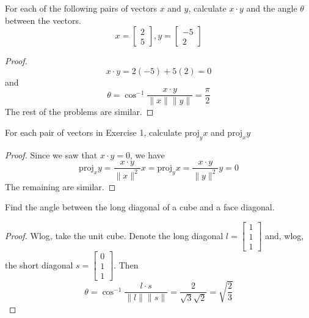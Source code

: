 \begin{exercise} \label{e1.2.1}
    For each of the following pairs of vectors \( x \) and \( y \), calculate \( x \cdot y \) and the angle \( \theta \) between the vectors.
    \[
    x=\begin{bmatrix}2\\5\end{bmatrix},y=\begin{bmatrix}-5\\2\end{bmatrix}
    \]
    \begin{proof}
        \[ x \cdot y = 2(-5)+5(2) = 0 \]
        and
        \[
        \theta = \cos^{-1}{\frac{x\cdot y}{\lVert x \rVert \lVert y \rVert}} = \frac{\pi}{2}
        \]
        The rest of the problems are similar.
    \end{proof}
\end{exercise} %

\begin{exercise} \label{e1.2.2}
    For each pair of vectors in Exercise 1, calculate \( \text{proj}_{y}x \) and \( \text{proj}_{x}y \)
    
    \begin{proof}
        Since we saw that \( x \cdot y = 0 \), we have
        \[ \text{proj}_{x}y = \frac{x \cdot y}{\lVert x \rVert^2}x = \text{proj}_{y}x = \frac{x \cdot y}{\lVert y \rVert^2}y = 0 \]
        The remaining are similar.
    \end{proof}
\end{exercise} %

\begin{exercise} \label{e1.2.3}
    Find the angle between the long diagonal of a cube and a face diagonal.
    
    \begin{proof}
        Wlog, take the unit cube. Denote the long diagonal \( l = \begin{bmatrix} 1\\1\\1 \end{bmatrix} \) and, wlog, the short diagonal \( s = \begin{bmatrix} 0 \\ 1 \\ 1 \end{bmatrix} \). Then
        \[
        \theta = \cos^{-1}\frac{l \cdot s}{\lVert l \rVert \lVert s \rVert} = \frac{2}{\sqrt{3}\sqrt{2}} = \sqrt{\frac{2}{3}}
        \]
    \end{proof}
\end{exercise} %

